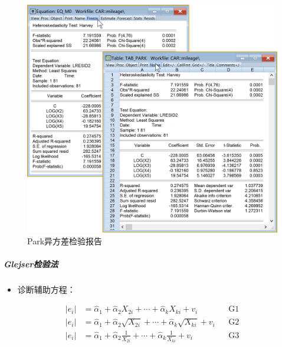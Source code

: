 \documentclass[12pt,(landscape,a4paper),(portrait,a4paper)]{article}
\providecommand{\tightlist}{%
  \setlength{\itemsep}{0pt}\setlength{\parskip}{0pt}}
\let\oldsubparagraph\subparagraph
\renewcommand{\subparagraph}[1]{\oldsubparagraph{#1}\mbox{}}
\begin{document}
\begin{figure}

{\centering \includegraphics[width=28.99in]{picture/lab6-heteroskedasticity/4-test-park2} 

}

\caption{Park异方差检验报告}\label{fig:fig-park-report}
\end{figure}

\hypertarget{glejser}{%
\subparagraph{Glejser检验法}\label{glejser}}

\begin{itemize}
\tightlist
\item
  诊断辅助方程：
\end{itemize}

\begin{align}
|e_i| & =\hat{\alpha}_1+\hat{\alpha}_2X_{2i}+\cdots+\hat{\alpha}_kX_{ki}+v_i &&\text{G1} \label{eq:G1}\\
|e_i| & =\hat{\alpha}_1+\hat{\alpha}_2\sqrt{X_{2i}}+\cdots+\hat{\alpha}_k\sqrt{X_{ki}}+v_i &&\text{G2} \label{eq:G2}\\
|e_i| & =\hat{\alpha}_1+\hat{\alpha}_2\frac{1}{X_{2i}}+\cdots+\hat{\alpha}_k\frac{1}{X_{ki}}+v_i &&\text{G3} \label{eq:G3}
\end{align}
\end{document}
